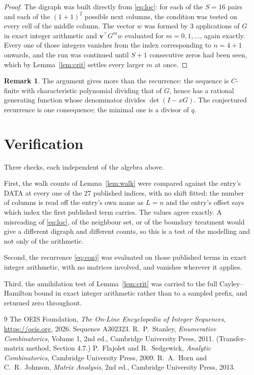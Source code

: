 \documentclass[11pt,a4paper]{article}
\theoremstyle{plain}
\theoremstyle{definition}
\newtheorem{remark}[theorem]{Remark}
\begin{document}
\begin{proof}
The digraph was built directly from \eqref{eq:loc}: for each of the $S=16$ pairs and each
of the $(1+1)^{2}$ possible next columns, the condition was tested on every cell of
the middle column. The vector $w$ was formed by $3$ applications of $G$ in exact integer
arithmetic and $\mathbf{v}^{\!\top}G^{m}w$ evaluated for $m=0,1,\dots$, again exactly.
Every one of those integers vanishes from the index corresponding to $n=4+1$ onwards,
and the run was continued until $S+1$ consecutive zeros had been seen, which by
Lemma~\ref{lem:crit} settles every larger $m$ at once.
\end{proof}

\begin{remark}
The argument gives more than the recurrence: the sequence is $C$-finite with characteristic
polynomial dividing that of $G$, hence has a rational generating function whose denominator
divides $\det(I-xG)$. The conjectured recurrence is one consequence; the minimal one is a
divisor of $q$.
\end{remark}

\section{Verification}

Three checks, each independent of the algebra above.

First, the walk counts of Lemma~\ref{lem:walk} were compared against the entry's DATA at
every one of the $27$ published indices, with no shift fitted: the number of columns is
read off the entry's own name as $L=n$ and the entry's offset says which index the first
published term carries. The values agree exactly. A misreading of \eqref{eq:loc}, of the
neighbour set, or of the boundary treatment would give a different digraph and different
counts, so this is a test of the modelling and not only of the arithmetic.

Second, the recurrence \eqref{eq:conj} was evaluated on those published terms in exact
integer arithmetic, with no matrices involved, and vanishes wherever it applies.

Third, the annihilation test of Lemma~\ref{lem:crit} was carried to the full
Cayley--Hamilton bound in exact integer arithmetic rather than to a sampled prefix, and
returned zero throughout.

\begin{thebibliography}{9}
 The OEIS Foundation, \emph{The On-Line Encyclopedia of Integer
Sequences}, \url{https://oeis.org}, 2026. Sequence A302323.
 R.~P.~Stanley, \emph{Enumerative Combinatorics}, Volume 1, 2nd ed.,
Cambridge University Press, 2011. (Transfer-matrix method, Section 4.7.)
 P.~Flajolet and R.~Sedgewick, \emph{Analytic Combinatorics}, Cambridge
University Press, 2009.
 R.~A.~Horn and C.~R.~Johnson, \emph{Matrix Analysis}, 2nd ed., Cambridge
University Press, 2013.
\end{thebibliography}
\end{document}
